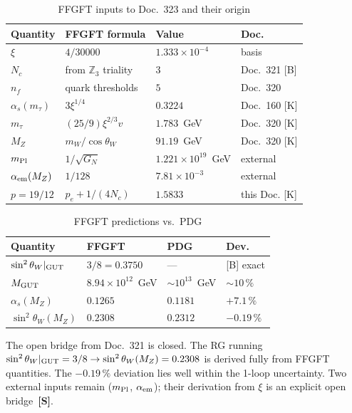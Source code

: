 \begin{table}[h]
\centering
\caption{FFGFT inputs to Doc.~323 and their origin}
\label{tab:inputs}
\begin{tabular}{llll}
\toprule
Quantity & FFGFT formula & Value & Doc. \\
\midrule
$\xi$ & $4/30000$ & $1.333\times10^{-4}$ & basis \\
$N_c$ & from $\mathbb{Z}_3$ triality & $3$ & Doc.~321 [B] \\
$n_f$ & quark thresholds & $5$ & Doc.~320 \\
$\alpha_s(m_\tau)$ & $3\xi^{1/4}$ & $0.3224$ & Doc.~160 [K] \\
$m_\tau$ & $(25/9)\xi^{2/3}v$ & $1.783$~GeV & Doc.~320 [K] \\
$M_Z$ & $m_W/\!\cos\theta_W$ & $91.19$~GeV & Doc.~320 [K] \\
$m_{\rm Pl}$ & $1/\sqrt{G_N}$ & $1.221\times10^{19}$~GeV & external \\
$\alpha_{\rm em}(M_Z)$ & $1/128$ & $7.81\times10^{-3}$ & external \\
$p = 19/12$ & $p_e + 1/(4N_c)$ & $1.5833$ & this Doc. [K] \\
\bottomrule
\end{tabular}
\end{table}

\begin{table}[h]
\centering
\caption{FFGFT predictions vs.\ PDG}
\label{tab:results}
\begin{tabular}{llll}
\toprule
Quantity & FFGFT & PDG & Dev. \\
\midrule
$\sin^2\theta_W|_{\rm GUT}$ & $3/8 = 0.3750$ & --- & [B] exact \\
$M_{\rm GUT}$ & $8.94\times10^{12}$~GeV & $\sim10^{13}$~GeV & $\sim10\,\%$ \\
$\alpha_s(M_Z)$ & $0.1265$ & $0.1181$ & $+7.1\,\%$ \\
$\sin^2\theta_W(M_Z)$ & $0.2308$ & $0.2312$ & $-0.19\,\%$ \\
\bottomrule
\end{tabular}
\end{table}

\begin{keyresult}
The open bridge from Doc.~321 is closed. The RG running
$\sin^2\theta_W|_{\rm GUT}=3/8 \to \sin^2\theta_W(M_Z)=0.2308$
is derived fully from FFGFT quantities. The $-0.19\,\%$ deviation
lies well within the 1-loop uncertainty. Two external inputs remain
($m_{\rm Pl}$, $\alpha_{\rm em}$); their derivation from $\xi$ is
an explicit open bridge~\textbf{[S]}.
\end{keyresult}
